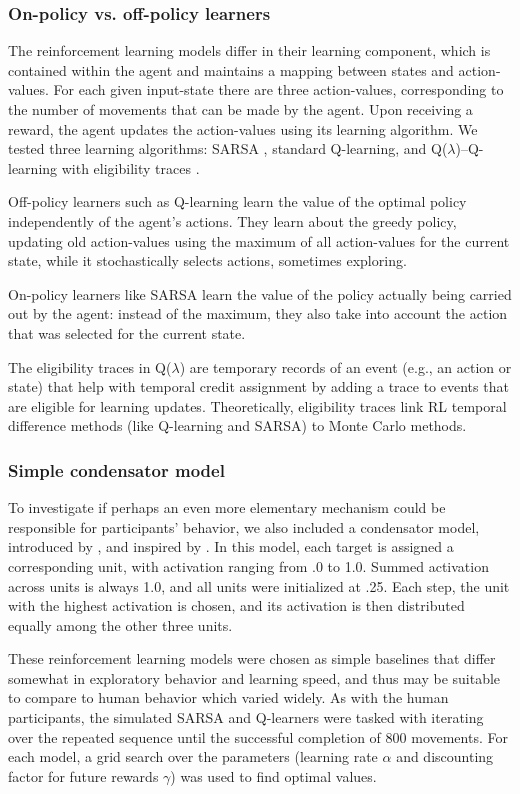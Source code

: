 \documentclass[man,floatsintext]{apa6}
\begin{document}
\subsubsection{On-policy vs. off-policy learners}
The reinforcement learning models differ in their learning component, which is contained within the agent and maintains a mapping between states and action-values. For each given input-state there are three action-values, corresponding to the number of movements that can be made by the agent. Upon receiving a reward, the agent updates the action-values using its learning algorithm. We tested three learning algorithms: SARSA \cite{Rummery94on-lineq-learning}, standard Q-learning, and Q($\lambda$)--Q-learning with eligibility traces \cite{Watkins:1989}. 

Off-policy learners such as Q-learning learn the value of the optimal policy independently of the agent's actions. They learn about the greedy policy, updating old action-values using the maximum of all action-values for the current state, while it stochastically selects actions, sometimes exploring. 

On-policy learners like SARSA learn the value of the policy actually being carried out by the agent: instead of the maximum, they also take into account the action that was selected for the current state. 

The eligibility traces in Q($\lambda$) are temporary records of an event (e.g., an action or state) that help with temporal credit assignment by adding a trace to events that are eligible for learning updates. Theoretically, eligibility traces link RL temporal difference methods (like Q-learning and SARSA) to Monte Carlo methods.

\subsubsection{Simple condensator model}
To investigate if perhaps an even more elementary mechanism could be responsible for participants' behavior, we also included a condensator model, introduced by , and inspired by . In this model, each target is assigned a corresponding unit, with activation ranging from .0 to 1.0. Summed activation across units is always 1.0, and all units were initialized at .25. Each step, the unit with the highest activation is chosen, and its activation is then distributed equally among the other three units.

These reinforcement learning models were chosen as simple baselines that differ somewhat in exploratory behavior and learning speed, and thus may be suitable to compare to human behavior which varied widely. As with the human participants, the simulated SARSA and Q-learners were tasked with iterating over the repeated sequence until the successful completion of 800 movements. For each model, a grid search over the parameters (learning rate $\alpha$ and discounting factor for future rewards $\gamma$) was used to find optimal values.
\end{document}

